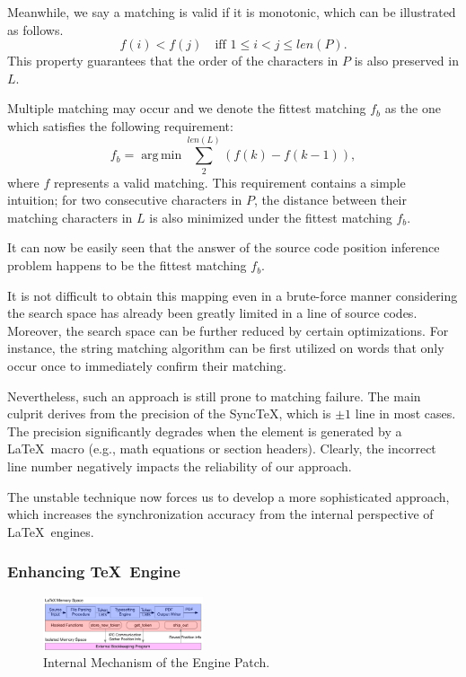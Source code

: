 \documentclass[sigconf]{acmart}
\DeclareMathOperator*{\argmin}{arg\,min}
\begin{document}
Meanwhile, we say a matching is valid if it is monotonic, which can be illustrated as follows.
\begin{equation}
f(i) < f(j)  \quad \text{iff } 1 \le i < j \le len(P).
\end{equation}
This property guarantees that the order of the characters in $P$ is also preserved in $L$.


Multiple matching may occur and we denote the fittest matching $f_b$ as the one which satisfies the following requirement:
\begin{equation}
f_b = \argmin \sum_{2}^{len(L)}(f(k) - f(k-1)),
\end{equation}
where $f$ represents a valid matching.
This requirement contains a simple intuition; for two consecutive characters in $P$, the distance between their matching characters in $L$ is also minimized under the fittest matching $f_b$. 


It can now be easily seen that the answer of the source code position inference problem happens to be the fittest matching $f_b$.

It is not difficult to obtain this mapping even in a brute-force manner considering the search space has already been greatly limited in a line of source codes.
Moreover, the search space can be further reduced by certain optimizations. For instance, the string matching algorithm can be first utilized on words that only occur once to immediately confirm their matching. 

Nevertheless, such an approach is still prone to matching failure. 
The main culprit derives from the precision of the Sync\TeX, which is $\pm 1$ line \cite{laurens2008direct} in most cases. 
The precision significantly degrades when the element is generated by a \LaTeX\ macro (e.g.,  math equations or section headers). 
Clearly, the incorrect line number negatively impacts the reliability of our approach.

The unstable technique now forces us to develop a more sophisticated approach, which increases the synchronization accuracy from the internal perspective of \LaTeX\ engines.

\subsubsection{Enhancing \TeX\ Engine}

\begin{figure}[t]
\begin{center}
\includegraphics[width=0.42\textwidth]{figure/patchengine}
\caption{Internal Mechanism of the Engine Patch.}
\label{fig:enginepatch}
\end{center}

\end{figure}
\end{document}
